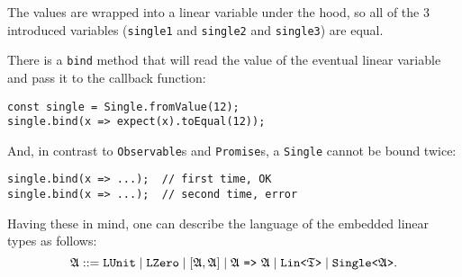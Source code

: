 The values are wrapped into a linear variable under the hood, so all of the 3 introduced variables (\texttt{single1} and \texttt{single2} and \texttt{single3}) are equal.

There is a \texttt{bind} method that will read the value of the eventual linear variable and pass it to the callback function:

\begin{verbatim}
const single = Single.fromValue(12);
single.bind(x => expect(x).toEqual(12));
\end{verbatim}

And, in contrast to \texttt{Observable}s and \texttt{Promise}s, a \texttt{Single} cannot be bound twice:

\begin{verbatim}
single.bind(x => ...);  // first time, OK
single.bind(x => ...);  // second time, error
\end{verbatim}

Having these in mind, one can describe the language of the embedded linear types as follows:
\[
\mathfrak{A} ::= \mathtt{LUnit} \mid \mathtt{LZero} \mid \mathtt{[}\mathfrak{A}, \mathfrak{A}\mathtt{]} \mid \mathfrak{A}\mbox{~\texttt{=>}~} \mathfrak{A} \mid \mbox{\texttt{Lin<}}\mathfrak{T}\mbox{\texttt{>}} \mid \mbox{\texttt{Single<}}\mathfrak{A}\mbox{\texttt{>}}.
\]